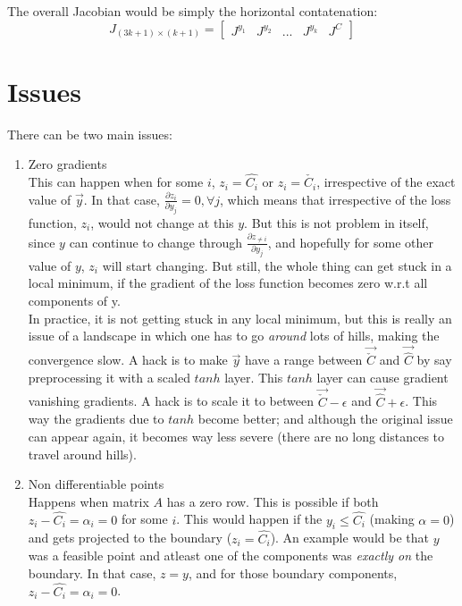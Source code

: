 \documentclass[11 pt]{article}
\begin{document}
The overall Jacobian would be simply the horizontal contatenation:
\begin{equation}
    J_{(3k+1)\times (k+1)} = \begin{bmatrix}J^{y_1}&J^{y_2}&...&J^{y_k}&J^C\end{bmatrix}
\end{equation}


\section{Issues}

There can be two main issues:
\begin{enumerate}
    \item Zero gradients \\
            This can happen when for some $i$, $z_i = \hat{C_i}$ or $z_i = \check{C_i}$, irrespective of the exact value of $\vec{y}$. In that case, $\frac{\partial z_i}{\partial y_j} = 0, \forall j$, which means that irrespective of the loss function, $z_i$, would not change at this $y$. But this is not problem in itself, since $y$ can continue to change through $\frac{\partial z_{\ne i}}{\partial y_j}$, and hopefully for some other value of $y$, $z_i$ will start changing. But still, the whole thing can get stuck in a local minimum, if the gradient of the loss function becomes zero w.r.t all components of y. \\
            In practice, it is not getting stuck in any local minimum, but this is really an issue of a landscape in which one has to go \textit{around} lots of hills, making the convergence slow. A hack is to make $\vec{y}$ have a range between $\vec{\check{C}}$ and $\vec{\hat{C}}$ by say preprocessing it with a scaled $tanh$ layer. This $tanh$ layer can cause gradient vanishing gradients. A hack is to scale it to between $\vec{\check{C}} - \epsilon$ and $\vec{\hat{C}} + \epsilon$. This way the gradients due to $tanh$ become better; and although the original issue can appear again, it becomes way less severe (there are no long distances to travel around hills). 
    \item Non differentiable points \\
            Happens when matrix $A$ has a zero row. This is possible if both $z_i - \hat{C_i} = \alpha_i = 0$ for some $i$. This would happen if the $y_i \le \hat{C_i}$ (making $\alpha=0$) and gets projected to the boundary ($z_i = \hat{C_i}$). An example would be that $y$ was a feasible point and atleast one of the components was \textit{exactly on} the boundary. In that case, $z=y$, and for those boundary components, $z_i - \hat{C_i} = \alpha_i = 0$.
\end{enumerate}
\end{document}
